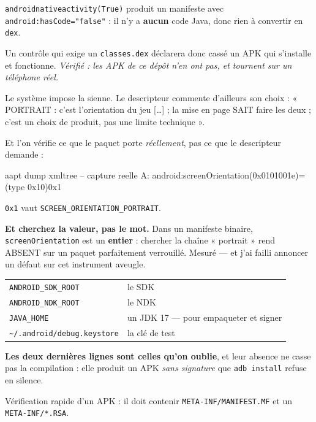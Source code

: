 \begin{nkretenir}
\texttt{androidnativeactivity(True)} produit un manifeste avec
\texttt{android:hasCode="false"} : il n'y a \textbf{aucun} code Java, donc rien à
convertir en \texttt{dex}.

\alerte{} Un contrôle qui exige un \texttt{classes.dex} déclarera donc cassé un APK qui
s'installe et fonctionne. \emph{Vérifié : les APK de ce dépôt n'en ont pas, et
tournent sur un téléphone réel.}
\end{nkretenir}

\begin{nkpiege}
Le système impose la sienne. Le descripteur commente d'ailleurs son choix :
« PORTRAIT : c'est l'orientation du jeu [\dots] ; la mise en page SAIT faire les
deux ; c'est un choix de produit, pas une limite technique ».

Et l'on vérifie ce que le paquet porte \emph{réellement}, pas ce que le
descripteur demande :

\begin{nkcode}{aapt dump xmltree -- capture reelle}
A: android:screenOrientation(0x0101001e)=(type 0x10)0x1
\end{nkcode}

\texttt{0x1} vaut \texttt{SCREEN\_ORIENTATION\_PORTRAIT}.

\alerte{} \textbf{Et cherchez la valeur, pas le mot.} Dans un manifeste binaire,
\texttt{screenOrientation} est un \textbf{entier} : chercher la chaîne
« portrait » rend ABSENT sur un paquet parfaitement verrouillé. Mesuré --- et
j'ai failli annoncer un défaut sur cet instrument aveugle.
\end{nkpiege}

\begin{nkretenir}
\begin{center}
\begin{tabular}{@{}ll@{}}
\toprule
\texttt{ANDROID\_SDK\_ROOT} & le SDK \\
\texttt{ANDROID\_NDK\_ROOT} & le NDK \\
\texttt{JAVA\_HOME} & un JDK 17 --- pour empaqueter et signer \\
\texttt{\textasciitilde/.android/debug.keystore} & la clé de test \\
\bottomrule
\end{tabular}
\end{center}

\textbf{Les deux dernières lignes sont celles qu'on oublie}, et leur absence ne
casse pas la compilation : elle produit un APK \emph{sans signature} que
\texttt{adb install} refuse en silence.

Vérification rapide d'un APK : il doit contenir \texttt{META-INF/MANIFEST.MF} et
un \texttt{META-INF/*.RSA}.
\end{nkretenir}

